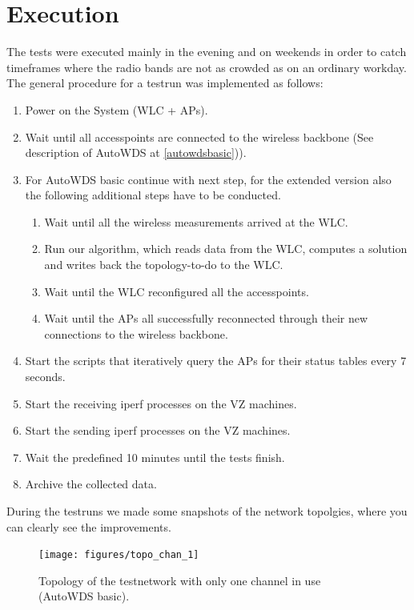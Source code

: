 \newpage
    
  \section{Execution}
    The tests were executed mainly in the evening and on weekends in order to catch timeframes where the radio bands are not as crowded as on an ordinary workday.
    The general procedure for a testrun was implemented as follows:
    \begin{enumerate}
      \item Power on the System (WLC + APs).
      \item Wait until all accesspoints are connected to the wireless backbone (See description of AutoWDS at \ref{autowdsbasic})).
      \item For AutoWDS basic continue with next step, for the extended version also the following additional steps have to be conducted.
	\begin{enumerate}
	 \item Wait until all the wireless measurements arrived at the \ac{WLC}.
	 \item Run our algorithm, which reads data from the WLC, computes a solution and writes back the topology-to-do to the WLC.
	 \item Wait until the WLC reconfigured all the accesspoints.
	 \item Wait until the APs all successfully reconnected through their new connections to the wireless backbone.
	\end{enumerate}
      \item Start the scripts that iteratively query the APs for their status tables every 7 seconds.
      \item Start the receiving iperf processes on the VZ machines.
      \item Start the sending iperf processes on the VZ machines.
      \item Wait the predefined 10 minutes until the tests finish.
      \item Archive the collected data.
    \end{enumerate}
    
\newpage

    During the testruns we made some snapshots of the network topolgies, where you can clearly see the improvements.    
    \begin{figure}[h!]
      \centering
	\texttt{[image: figures/topo\_chan\_1]}%
	\caption{Topology of the testnetwork with only one channel in use (AutoWDS basic).\protect\footnotemark }
      \label{fig:topo_chan_1}
    \end{figure}
    
